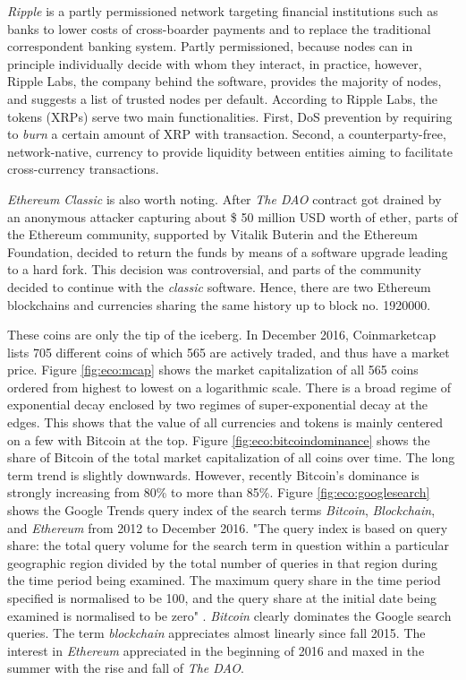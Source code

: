 \emph{Ripple} is a partly permissioned network targeting financial institutions such as banks to lower costs of cross-boarder payments and to replace the traditional correspondent banking system. Partly permissioned, because nodes can in principle individually decide with whom they interact, in practice, however, Ripple Labs, the company behind the software,  provides the majority of nodes, and suggests a list of trusted nodes per default. According to Ripple Labs, the tokens (XRPs) serve two main functionalities. First, \ac{DoS} prevention by requiring to \emph{burn} a certain amount of XRP with transaction. Second, a counterparty-free, network-native, currency to provide liquidity between entities aiming to facilitate cross-currency transactions. 

\emph{Ethereum Classic} is also worth noting. After \emph{The DAO} contract got drained by an anonymous attacker capturing about \$ 50 million USD worth of ether, parts of the Ethereum community, supported by Vitalik Buterin and the Ethereum Foundation, decided to return the funds by means of a software upgrade leading to a hard fork. This decision was controversial, and parts of the community decided to continue with the \emph{classic} software. Hence, there are two Ethereum blockchains and currencies sharing the same history up to block no. 1920000. 

These coins are only the tip of the iceberg. In December 2016, Coinmarketcap lists 705 different coins of which 565 are actively traded, and thus have a market price. Figure \ref{fig:eco:mcap} shows the market capitalization of all 565 coins ordered from highest to lowest on a logarithmic scale. There is a broad regime of exponential decay enclosed by two regimes of super-exponential decay at the edges. This shows that the value of all currencies and tokens is mainly centered on a few with Bitcoin at the top. Figure \ref{fig:eco:bitcoindominance} shows the share of Bitcoin of the total market capitalization of all coins over time. The long term trend is slightly downwards. However, recently Bitcoin's dominance is strongly increasing from 80\% to more than 85\%. Figure \ref{fig:eco:googlesearch} shows the Google Trends query index of the search terms \emph{Bitcoin}, \emph{Blockchain}, and \emph{Ethereum} from 2012 to December 2016. "The query index is based on query share: the total query volume for the search term in question within a particular geographic region divided by the total number of queries in that region during the time period being examined. The maximum query share in the time period specified is normalised to be 100, and the query share at the initial date being examined is normalised to be zero" \parencite{ECOR:ECOR809}. \emph{Bitcoin} clearly dominates the Google search queries. The term \emph{blockchain} appreciates almost linearly since fall 2015. The interest in \emph{Ethereum} appreciated in the beginning of 2016 and maxed in the summer with the rise and fall of \emph{The DAO}.


